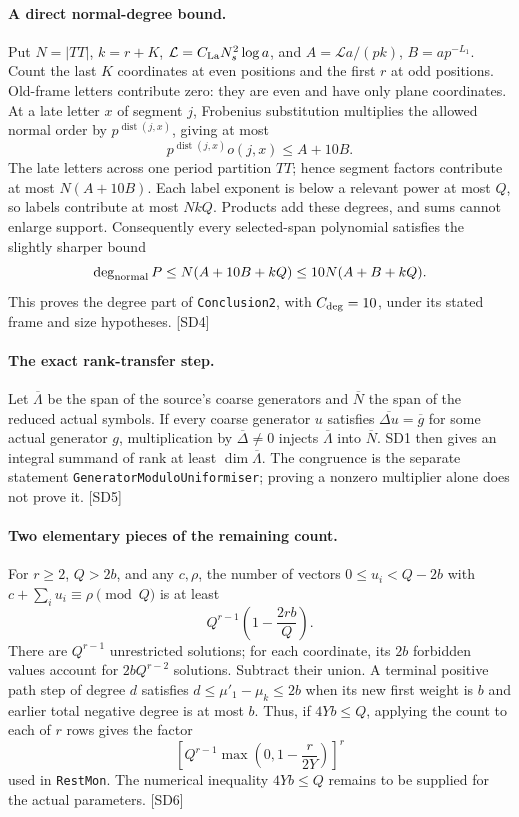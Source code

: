 \paragraph{A direct normal-degree bound.}
Put $N=|TT|$, $k=r+K$, $\mathcal L=C_{\rm La}N_s^2\log a$, and
$A=\mathcal L a/(pk)$, $B=ap^{-L_1}$. Count the last $K$ coordinates at even positions and the first $r$ at odd positions. Old-frame letters contribute zero: they are even and have only plane coordinates. At a late letter $x$ of segment $j$, Frobenius substitution multiplies the allowed normal order by $p^{\operatorname{dist}(j,x)}$, giving at most
\[
 p^{\operatorname{dist}(j,x)}o(j,x)\le A+10B.
\]
The late letters across one period partition $TT$; hence segment factors contribute at most $N(A+10B)$. Each label exponent is below a relevant power at most $Q$, so labels contribute at most $NkQ$. Products add these degrees, and sums cannot enlarge support. Consequently every selected-span polynomial satisfies the slightly sharper bound
\[
 \deg_{\rm normal}P\le N(A+10B+kQ)
                 \le10N(A+B+kQ).
\]
This proves the degree part of \texttt{Conclusion2}, with $C_{\rm deg}=10$, under its stated frame and size hypotheses. \textsf{[SD4]}

\paragraph{The exact rank-transfer step.}
Let $\overline\Lambda$ be the span of the source's coarse generators and $\overline N$ the span of the reduced actual symbols. If every coarse generator $u$ satisfies $\overline{\Delta u}=\overline g$ for some actual generator $g$, multiplication by $\overline\Delta\ne0$ injects $\overline\Lambda$ into $\overline N$. SD1 then gives an integral summand of rank at least $\dim\overline\Lambda$. The congruence is the separate statement \texttt{GeneratorModuloUniformiser}; proving a nonzero multiplier alone does not prove it. \textsf{[SD5]}

\paragraph{Two elementary pieces of the remaining count.}
For $r\ge2$, $Q>2b$, and any $c,\rho$, the number of vectors $0\le u_i<Q-2b$ with $c+\sum_i u_i\equiv\rho\pmod Q$ is at least
\[
 Q^{r-1}\left(1-\frac{2rb}{Q}\right).
\]
There are $Q^{r-1}$ unrestricted solutions; for each coordinate, its $2b$ forbidden values account for $2bQ^{r-2}$ solutions. Subtract their union. A terminal positive path step of degree $d$ satisfies
$d\le\mu'_1-\mu_k\le2b$ when its new first weight is $b$ and earlier total negative degree is at most $b$. Thus, if $4Yb\le Q$, applying the count to each of $r$ rows gives the factor
\[
 \left[Q^{r-1}\max\!\left(0,1-\frac r{2Y}\right)\right]^r
\]
used in \texttt{RestMon}. The numerical inequality $4Yb\le Q$ remains to be supplied for the actual parameters. \textsf{[SD6]}

